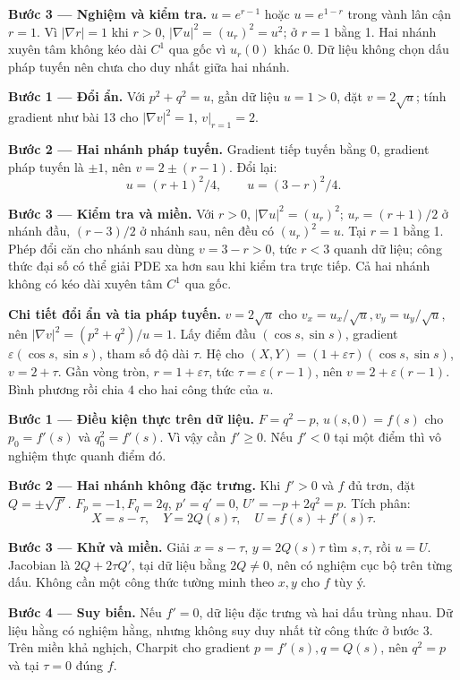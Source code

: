 \textbf{Bước 3 — Nghiệm và kiểm tra.} $u=e^{r-1}$ hoặc $u=e^{1-r}$ trong vành lân cận $r=1$. Vì $|\nabla r|=1$ khi $r>0$, $|\nabla u|^2=(u_r)^2=u^2$; ở $r=1$ bằng 1. Hai nhánh xuyên tâm không kéo dài $C^1$ qua gốc vì $u_r(0)$ khác 0. Dữ liệu không chọn dấu pháp tuyến nên chưa cho duy nhất giữa hai nhánh.

\textbf{Bước 1 — Đổi ẩn.} Với $p^2+q^2=u$, gần dữ liệu $u=1>0$, đặt $v=2\sqrt u$; tính gradient như bài 13 cho $|\nabla v|^2=1$, $v|_{r=1}=2$.

\textbf{Bước 2 — Hai nhánh pháp tuyến.} Gradient tiếp tuyến bằng 0, gradient pháp tuyến là $\pm1$, nên $v=2\pm(r-1)$. Đổi lại:
\[u=(r+1)^2/4,\qquad u=(3-r)^2/4.\]

\textbf{Bước 3 — Kiểm tra và miền.} Với $r>0$, $|\nabla u|^2=(u_r)^2$; $u_r=(r+1)/2$ ở nhánh đầu, $(r-3)/2$ ở nhánh sau, nên đều có $(u_r)^2=u$. Tại $r=1$ bằng 1. Phép đổi căn cho nhánh sau dùng $v=3-r>0$, tức $r<3$ quanh dữ liệu; công thức đại số có thể giải PDE xa hơn sau khi kiểm tra trực tiếp. Cả hai nhánh không có kéo dài xuyên tâm $C^1$ qua gốc.

\textbf{Chi tiết đổi ẩn và tia pháp tuyến.} $v=2\sqrt u$ cho $v_x=u_x/\sqrt u,v_y=u_y/\sqrt u$, nên $|\nabla v|^2=(p^2+q^2)/u=1$. Lấy điểm đầu $(\cos s,\sin s)$, gradient $\varepsilon(\cos s,\sin s)$, tham số độ dài $\tau$. Hệ cho $(X,Y)=(1+\varepsilon\tau)(\cos s,\sin s)$, $v=2+\tau$. Gần vòng tròn, $r=1+\varepsilon\tau$, tức $\tau=\varepsilon(r-1)$, nên $v=2+\varepsilon(r-1)$. Bình phương rồi chia $4$ cho hai công thức của $u$.

\textbf{Bước 1 — Điều kiện thực trên dữ liệu.} $F=q^2-p$, $u(s,0)=f(s)$ cho $p_0=f'(s)$ và $q_0^2=f'(s)$. Vì vậy cần $f'\ge0$. Nếu $f'<0$ tại một điểm thì vô nghiệm thực quanh điểm đó.

\textbf{Bước 2 — Hai nhánh không đặc trưng.} Khi $f'>0$ và $f$ đủ trơn, đặt $Q=\pm\sqrt{f'}$. $F_p=-1,F_q=2q$, $p'=q'=0$, $U'=-p+2q^2=p$. Tích phân:
\[X=s-\tau,\quad Y=2Q(s)\tau,\quad U=f(s)+f'(s)\tau.\]

\textbf{Bước 3 — Khử và miền.} Giải $x=s-\tau$, $y=2Q(s)\tau$ tìm $s,\tau$, rồi $u=U$. Jacobian là $2Q+2\tau Q'$, tại dữ liệu bằng $2Q\ne0$, nên có nghiệm cục bộ trên từng dấu. Không cần một công thức tường minh theo $x,y$ cho $f$ tùy ý.

\textbf{Bước 4 — Suy biến.} Nếu $f'=0$, dữ liệu đặc trưng và hai dấu trùng nhau. Dữ liệu hằng có nghiệm hằng, nhưng không suy duy nhất từ công thức ở bước 3. Trên miền khả nghịch, Charpit cho gradient $p=f'(s),q=Q(s)$, nên $q^2=p$ và tại $\tau=0$ đúng $f$.

